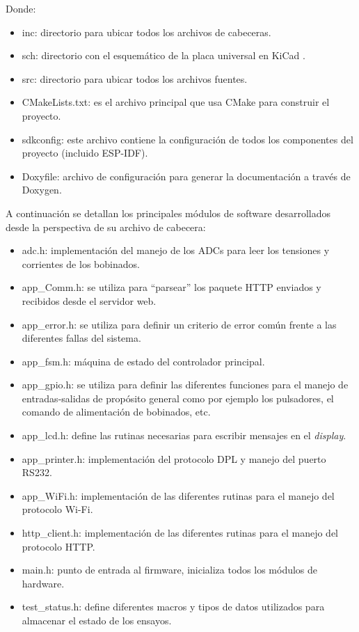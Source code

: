Donde: 
\begin{itemize}
\item inc: directorio para ubicar todos los archivos de cabeceras.
\item sch: directorio con el esquemático de la placa universal en KiCad \citep{KICAD}.
\item src: directorio para ubicar todos los archivos fuentes.
\item CMakeLists.txt: es el archivo principal que usa CMake para construir el proyecto.
\item sdkconfig: este archivo contiene la configuración de todos los componentes del proyecto (incluido ESP-IDF).
\item Doxyfile: archivo de configuración para generar la documentación a través de Doxygen.
\end{itemize}

A continuación se detallan los principales módulos de software desarrollados desde la perspectiva de su archivo de cabecera:

\begin{itemize}
\item adc.h: implementación del manejo de los ADCs para leer los tensiones y corrientes de los bobinados.
\item app\_Comm.h: se utiliza para ``parsear'' los paquete HTTP enviados y recibidos desde el servidor web.
\item app\_error.h: se utiliza para definir un criterio de error común frente a las diferentes fallas del sistema.
\item app\_fsm.h: máquina de estado del controlador principal.
\item app\_gpio.h: se utiliza para definir las diferentes funciones para el manejo de entradas-salidas de propósito general como por ejemplo los pulsadores, el comando de alimentación de bobinados, etc.
\item app\_lcd.h: define las rutinas necesarias para escribir mensajes en el \textit{display}.
\item app\_printer.h: implementación del protocolo DPL y manejo del puerto RS232.
\item app\_WiFi.h: implementación de las diferentes rutinas para el manejo del protocolo Wi-Fi.
\item http\_client.h: implementación de las diferentes rutinas para el manejo del protocolo HTTP.
\item main.h: punto de entrada al firmware, inicializa todos los módulos de hardware.
\item test\_status.h: define diferentes macros y tipos de datos utilizados para almacenar el estado de los ensayos.
\end{itemize}

